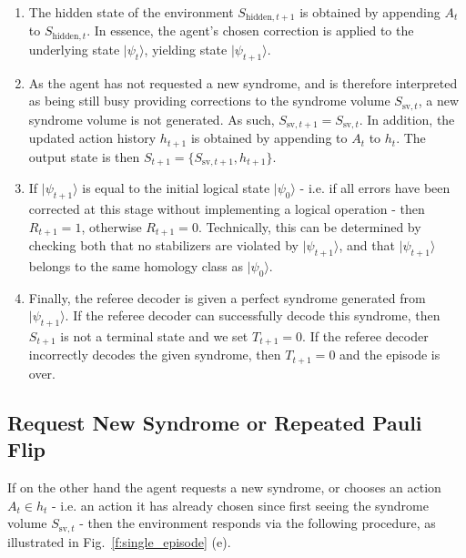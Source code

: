 \documentclass[twocolumn,preprintnumbers,amsmath,amssymb,notitlepage,nofootinbib,longbibliography,superscriptaddress,aps,pra,10pt]{revtex4-1}
\begin{document}
	\begin{enumerate}
		\item The hidden state of the environment $S_{\mathrm{hidden},t+1}$ is obtained by appending $A_t$ to $S_{\mathrm{hidden},t}$. In essence, the agent's chosen correction is applied to the  underlying state $|\psi_t\rangle$, yielding state $|\psi_{t+1}\rangle$.
		\item As the agent has not requested a new syndrome, and is therefore interpreted as being still busy providing corrections to the syndrome volume $S_{\mathrm{sv},t}$, a new syndrome volume is not generated.
		As such, $S_{\mathrm{sv},t+1} = S_{\mathrm{sv},t}$.
		In addition, the updated action history $h_{t+1}$ is obtained by appending to $A_t$ to $h_t$.
		The output state is then $S_{t+1} = \{S_{\mathrm{sv},t+1},h_{t+1}\}$.
		\item If $|\psi_{t+1}\rangle$ is equal to the initial logical state $|\psi_0\rangle$ - i.e. if all errors have been corrected at this stage without implementing a logical operation - then $R_{t+1} = 1$, otherwise $R_{t+1} = 0$. Technically, this can be determined by checking both that no stabilizers are violated by $|\psi_{t+1}\rangle$, and that $|\psi_{t+1}\rangle$ belongs to the same homology class as $|\psi_0\rangle$.
		\item Finally, the referee decoder is given a perfect syndrome generated from $|\psi_{t+1}\rangle$. If the referee decoder can successfully decode this syndrome, then $S_{t+1}$ is not a terminal state and we set $T_{t+1} = 0$. If the referee decoder incorrectly decodes the given syndrome, then $T_{t+1} = 0$ and the episode is over.
	\end{enumerate}

	\subsection{Request New Syndrome or Repeated Pauli Flip}

	If on the other hand the agent requests a new syndrome, or chooses an action $A_t \in h_t$ - i.e. an action it has already chosen since first seeing the syndrome volume $S_{\mathrm{sv},t}$ - then the environment responds via the following procedure, as illustrated in Fig.~\ref{f:single_episode} (e).
\end{document}
